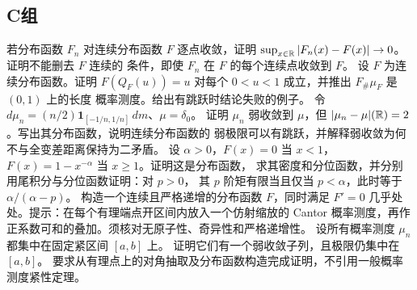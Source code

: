 \subsection*{C组}
\begin{enumerate}[label=\textbf{\thechapter.\arabic*.},resume]
若分布函数 \(F_n\) 对连续分布函数 \(F\) 逐点收敛，证明
\(\sup_{x\in\mathbb{R}}|F_n(x)-F(x)|\to0\)。证明不能删去 \(F\) 连续的
条件，即使 \(F_n\) 在 \(F\) 的每个连续点收敛到 \(F\)。
设 \(F\) 为连续分布函数。证明 \(F(Q_F(u))=u\) 对每个
\(0<u<1\) 成立，并推出 \(F_\#\mu_F\) 是 \((0,1)\) 上的长度
概率测度。给出有跳跃时结论失败的例子。
令 \(d\mu_n=(n/2)\mathbf1_{[-1/n,1/n]}\,dm\)、\(\mu=\delta_0\)。
证明 \(\mu_n\) 弱收敛到 \(\mu\)，但
\(|\mu_n-\mu|(\mathbb{R})=2\)。写出其分布函数，说明连续分布函数的
弱极限可以有跳跃，并解释弱收敛为何不与全变差距离保持为二矛盾。
设 \(\alpha>0\)，\(F(x)=0\) 当 \(x<1\)，
\(F(x)=1-x^{-\alpha}\) 当 \(x\ge1\)。证明这是分布函数，
求其密度和分位函数，并分别用尾积分与分位函数证明：对 \(p>0\)，
其 \(p\) 阶矩有限当且仅当 \(p<\alpha\)，此时等于
\(\alpha/(\alpha-p)\)。
构造一个连续且严格递增的分布函数 \(F\)，同时满足 \(F'=0\)
几乎处处。提示：在每个有理端点开区间内放入一个仿射缩放的 Cantor
概率测度，再作正系数可和的叠加。须核对无原子性、奇异性和严格递增性。
设所有概率测度 \(\mu_n\) 都集中在固定紧区间 \([a,b]\) 上。
证明它们有一个弱收敛子列，且极限仍集中在 \([a,b]\)。
要求从有理点上的对角抽取及分布函数构造完成证明，不引用一般概率
测度紧性定理。
\end{enumerate}
